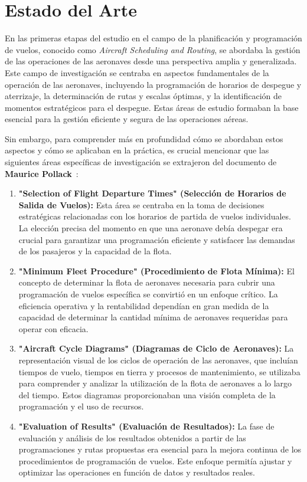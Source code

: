 \documentclass[letter, 10pt]{article}
\begin{document}
\section{Estado del Arte}
En las primeras etapas del estudio en el campo de la planificaci\'on y programaci\'on de vuelos, conocido como \textit{Aircraft Scheduling and Routing}, se abordaba la gesti\'on de las operaciones de las aeronaves desde una perspectiva amplia y generalizada. Este campo de investigaci\'on se centraba en aspectos fundamentales de la operaci\'on de las aeronaves, incluyendo la programaci\'on de horarios de despegue y aterrizaje, la determinaci\'on de rutas y escalas \'optimas, y la identificaci\'on de momentos estrat\'egicos para el despegue. Estas \'areas de estudio formaban la base esencial para la gesti\'on eficiente y segura de las operaciones a\'ereas.

Sin embargo, para comprender m\'as en profundidad c\'omo se abordaban estos aspectos y c\'omo se aplicaban en la pr\'actica, es crucial mencionar que las siguientes \'areas espec\'ificas de investigaci\'on se extrajeron del documento de \textbf{Maurice Pollack}~\cite{pollack1974}:

\begin{enumerate}
    \item \textbf{"Selection of Flight Departure Times" (Selecci\'on de Horarios de Salida de Vuelos):} Esta \'area se centraba en la toma de decisiones estrat\'egicas relacionadas con los horarios de partida de vuelos individuales. La elecci\'on precisa del momento en que una aeronave deb\'ia despegar era crucial para garantizar una programaci\'on eficiente y satisfacer las demandas de los pasajeros y la capacidad de la flota.

    \item \textbf{"Minimum Fleet Procedure" (Procedimiento de Flota M\'inima):} El concepto de determinar la flota de aeronaves necesaria para cubrir una programaci\'on de vuelos espec\'ifica se convirti\'o en un enfoque cr\'itico. La eficiencia operativa y la rentabilidad depend\'ian en gran medida de la capacidad de determinar la cantidad m\'inima de aeronaves requeridas para operar con eficacia.

    \item \textbf{"Aircraft Cycle Diagrams" (Diagramas de Ciclo de Aeronaves):} La representaci\'on visual de los ciclos de operaci\'on de las aeronaves, que inclu\'ian tiempos de vuelo, tiempos en tierra y procesos de mantenimiento, se utilizaba para comprender y analizar la utilizaci\'on de la flota de aeronaves a lo largo del tiempo. Estos diagramas proporcionaban una visi\'on completa de la programaci\'on y el uso de recursos.

    \item \textbf{"Evaluation of Results" (Evaluaci\'on de Resultados):} La fase de evaluaci\'on y an\'alisis de los resultados obtenidos a partir de las programaciones y rutas propuestas era esencial para la mejora continua de los procedimientos de programaci\'on de vuelos. Este enfoque permit\'ia ajustar y optimizar las operaciones en funci\'on de datos y resultados reales.
\end{enumerate}
\end{document}
